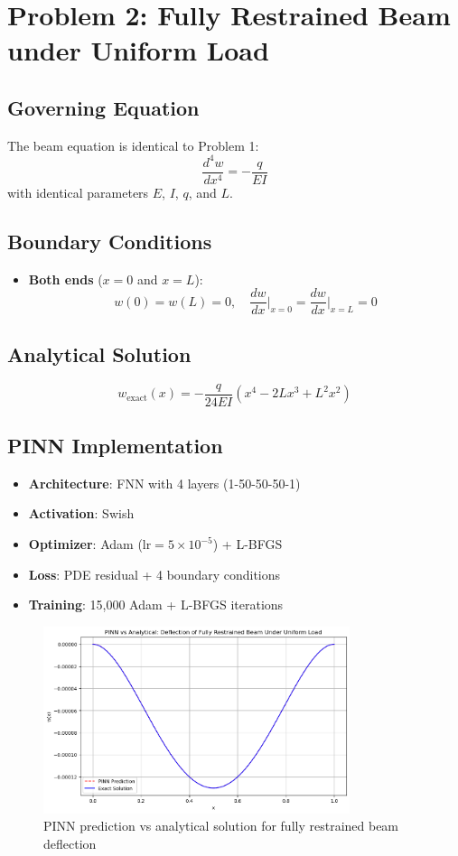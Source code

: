 \documentclass{article}
\begin{document}
\section*{Problem 2: Fully Restrained Beam under Uniform Load}

\subsection*{Governing Equation}
The beam equation is identical to Problem 1:
\[
\frac{d^4 w}{dx^4} = -\frac{q}{EI}
\]
with identical parameters \( E \), \( I \), \( q \), and \( L \).

\subsection*{Boundary Conditions}
\begin{itemize}
    \item \textbf{Both ends} (\( x = 0 \) and \( x = L \)):
        \[
        w(0) = w(L) = 0, \quad \frac{dw}{dx}\Big|_{x=0} = \frac{dw}{dx}\Big|_{x=L} = 0
        \]
\end{itemize}

\subsection*{Analytical Solution}
\[
w_{\text{exact}}(x) = -\frac{q}{24EI} \left( x^4 - 2Lx^3 + L^2x^2 \right)
\]

\subsection*{PINN Implementation}
\begin{itemize}
    \item \textbf{Architecture}: FNN with 4 layers (1-50-50-50-1)
    \item \textbf{Activation}: Swish
    \item \textbf{Optimizer}: Adam (\( \text{lr} = 5 \times 10^{-5} \)) + L-BFGS
    \item \textbf{Loss}: PDE residual + 4 boundary conditions
    \item \textbf{Training}: 15,000 Adam + L-BFGS iterations
\end{itemize}

\begin{figure}[H]
    \centering
    \includegraphics[width=0.8\textwidth]{geom2.png}
    \caption{PINN prediction vs analytical solution for fully restrained beam deflection}
    \label{fig:restrained}
\end{figure}
\end{document}
